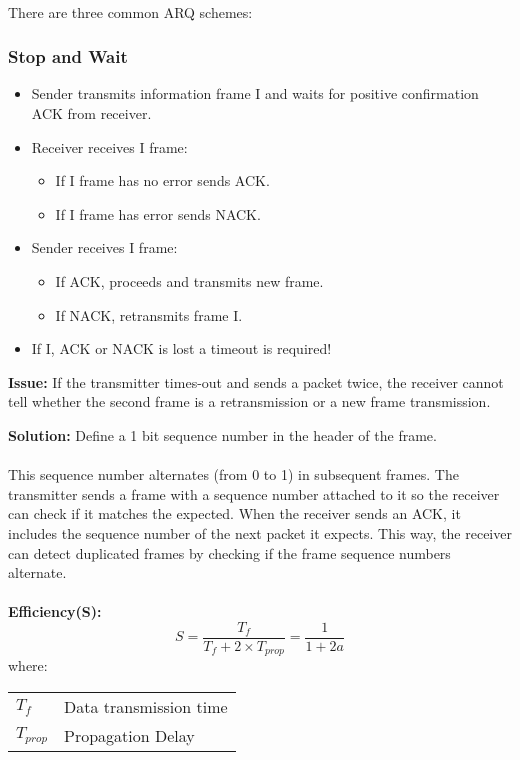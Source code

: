 \documentclass[../resumosRCOM.tex]{subfiles}
\makeatletter
\newenvironment{conditions}
  {\par\vspace{\abovedisplayskip}\noindent\begin{tabular}{>{$}l<{$} @{${}={}$} l}}
  {\end{tabular}\par\vspace{\belowdisplayskip}}
\makeatother
\begin{document}
\paragraph{}
There are three common ARQ schemes:

\subsubsection{Stop and Wait}
\begin{itemize}
    \item  Sender transmits information frame I and waits for positive confirmation
    ACK from receiver.
    \item Receiver receives I frame:
    \begin{itemize}
        \item If I frame has no error sends ACK.
        \item If I frame has error sends NACK.
    \end{itemize}
    \item Sender receives I frame:
    \begin{itemize}
        \item If ACK, proceeds and transmits new frame.
        \item If NACK, retransmits frame I.
    \end{itemize} 
    \item If I, ACK or NACK is lost a timeout is required!
\end{itemize}

\textbf{Issue:}
If the transmitter times-out and sends a packet twice, the receiver cannot tell 
whether the second frame is a retransmission or a new frame transmission.

\textbf{Solution:}
Define a 1 bit sequence number in the header of the frame.

\paragraph{}
This sequence number alternates (from 0 to 1) in subsequent frames. The transmitter sends
a frame with a sequence number attached to it so the receiver can check if it matches the 
expected.  When the receiver sends an ACK, it includes the sequence number of the next 
packet it expects.  This way, the receiver can detect duplicated frames by checking if the
frame sequence numbers alternate.

\paragraph{}
\textbf{Efficiency(S):}
\begin{equation}
    {S}=\frac{T_f}{T_f + 2 \times T_{prop}} = \frac{1}{1+2a}
\end{equation}
where:
\begin{conditions}
   T_f     &   Data transmission time\\
   T_{prop} &  Propagation Delay 
\end{conditions}
\end{document}
